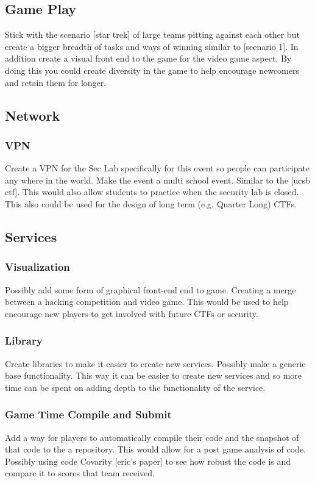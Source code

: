 \documentclass[10pt]{article}
\begin{document}
\subsection{Game Play}
Stick with the scenario [star trek] of large teams pitting against each other 
but create a bigger breadth of tasks and ways of winning similar to [scenario 1].
In addition create a visual front end to the game for the video game aspect.
By doing this you could create diversity in the game to help encourage newcomers
and retain them for longer.

\subsection{Network}

\subsubsection{VPN}
Create a VPN for the Sec Lab specifically for this event so people can participate any where
in the world. Make the event a multi school event. Similar to the [ucsb ctf]. This would
also allow students to practice when the security lab is closed. This also could be used
for the design of long term (e.g. Quarter Long) CTFs.

\subsection{Services}

\subsubsection{Visualization}
Possibly add some form of graphical front-end end to game. Creating a merge between
a hacking competition and video game. This would be used to help encourage new players
to get involved with future CTFs or security.

\subsubsection{Library}
Create libraries to make it easier to create new services. Possibly make a generic base
functionality. This way it can be easier to create new services and so more time can
be spent on adding depth to the functionality of the service.

\subsubsection{Game Time Compile and Submit}
Add a way for players to automatically compile their code and the snapshot of that code
to the a repository. This would allow for a post game analysis of code. Possibly using
code Covarity [eric's paper] to see how robust the code is and compare it to scores
that team received.
\end{document}
